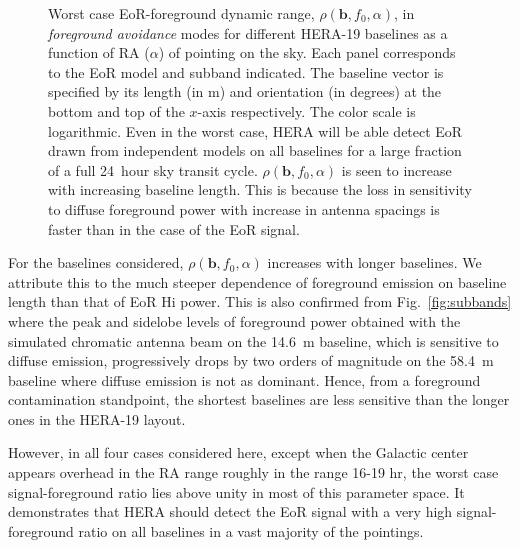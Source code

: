\documentclass[preprint2,iop,numberedappendix,twocolappendix,appendixfloats]{emulateapj}
\begin{document}
\begin{figure}[htb]
\caption{Worst case EoR-foreground dynamic range, $\rho(\boldsymbol{b},f_0,\alpha)$, in {\it foreground avoidance} modes for different HERA-19 baselines as a function of RA ($\alpha$) of pointing on the sky. Each panel corresponds to the EoR model and subband indicated. The baseline vector is specified by its length (in m) and orientation (in degrees) at the bottom and top of the $x$-axis respectively. The color scale is logarithmic. Even in the worst case, HERA will be able detect EoR drawn from independent models on all baselines for a large fraction of a full 24~hour sky transit cycle. $\rho(\boldsymbol{b},f_0,\alpha)$ is seen to increase with increasing baseline length. This is because the loss in sensitivity to diffuse foreground power with increase in antenna spacings is faster than in the case of the EoR signal.}
\label{fig:eor-fg-ratios}
\end{figure}

For the baselines considered, $\rho(\boldsymbol{b},f_0,\alpha)$ increases with longer baselines. We attribute this to the much steeper dependence of foreground emission on baseline length than that of EoR H{\sc i} power. This is also confirmed from Fig.~\ref{fig:subbands} where the peak and sidelobe levels of foreground power obtained with the simulated chromatic antenna beam on the 14.6~m baseline, which is sensitive to diffuse emission, progressively drops by two orders of magnitude on the 58.4~m baseline where diffuse emission is not as dominant. Hence, from a foreground contamination standpoint, the shortest baselines are less sensitive than the longer ones in the HERA-19 layout.

However, in all four cases considered here, except when the Galactic center appears overhead in the RA range roughly in the range 16-19 hr, the worst case signal-foreground ratio lies above unity in most of this parameter space. It demonstrates that HERA should detect the EoR signal with a very high signal-foreground ratio on all baselines in a vast majority of the pointings. 

\end{document}
